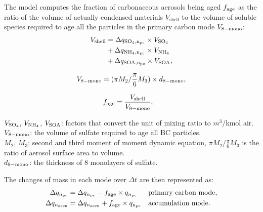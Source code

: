 \documentclass[12pt, fullpage]{uiucthesis2009}
\begin{document}
	The model computes the fraction of carbonaceous aerosols being aged $f_{\rm{age}}$ as the ratio of the volume of actually condensed materials $V_\text{shell}$ to the volume of soluble species required to age all the particles in the primary carbon mode $V_{\rm{8-mono}}$:
	\begin{align}
	\begin{split}
	V_{\rm{shell}} &=  \Delta q_{\rm{SO_4}, n_{\rm{pc}}} \times V_{\rm{SO_4}} \\
	&+ \Delta q_{\rm{NH_4}, n_{\rm{pc}}} \times V_{\rm{NH_4}} \\
	&+ \Delta q_{\rm{SOA}, n_{\rm{pc}}} \times V_{\rm{SOA}}, 
	\end{split}
	\end{align}
	
	\begin{align}
	\begin{split}
	V_{\rm{8-mono}} = (\pi M_2/ \frac{\pi}{6}M_3) \times d_{\rm{8-mono}},
	\end{split}
	\end{align}
	
	\begin{align}
	f_{\rm{age}} &= \frac{V_{\rm{shell}}}{V_{\rm{8-mono}}},  
	\end{align}
	
	\begin{flushleft}
		$V_{\rm{SO_4}}$, $V_{\rm{NH_4}}$, $V_{\rm{SOA}}$: factors that convert the unit of mixing ratio to $m^3/$kmol air. \\
		$V_{\rm{8-mono}}$: the volume of sulfate required to age all BC particles. \\
		$M_2$, $M_3$: second and third moment of  moment dynamic equation, $\pi M_2/ \frac{\pi}{6}M_3$ is the ratio of aerosol surface area to volume. \\
		$d_{\rm{8-mono}}$: the thickness of 8 monolayers of sulfate.
	\end{flushleft}
	
	The changes of mass in each mode over $\Delta t$ are then represented as:
	\begin{align}
	\Delta q_{n_{\rm{pc}}} &= \Delta q_{n_{\rm{pc}}} - f_{\rm{age}} \times q_{n_{\rm{pc}}}  &&\text{primary carbon mode}, \\
	\Delta q_{n_{\rm{accu}}} &= \Delta q_{n_{\rm{accu}}} + f_{\rm{age}} \times q_{\rm{n_{\rm{pc}}}}  &&\text{accumulation mode}.
	\end{align}
	
\end{document}
